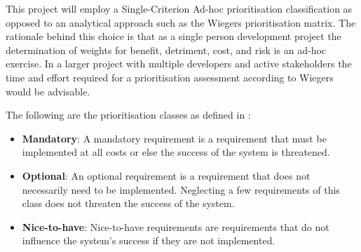 This project will employ a Single-Criterion Ad-hoc prioritisation classification as opposed to an analytical approach such as the Wiegers prioritisation matrix. The rationale behind this choice is that as a single person development project the determination of weights for benefit, detriment, cost, and risk is an ad-hoc exercise. In a larger project with multiple developers and active stakeholders the time and effort required for a prioritisation assessment according to Wiegers would be advisable.

The following are the prioritisation classes as defined in \cite{9781937538774}:

\begin{itemize}[label={}]

\item \textbf{Mandatory}: A mandatory requirement is a requirement that must be implemented at all costs or else the success of the system is threatened.
\item \textbf{Optional}: An optional requirement is a requirement that does not necessarily need to be implemented. Neglecting a few requirements of this class does not threaten the success of the system.
\item \textbf{Nice-to-have}: Nice-to-have requirements are requirements that do not influence the system’s success if they are not implemented.

\end{itemize}